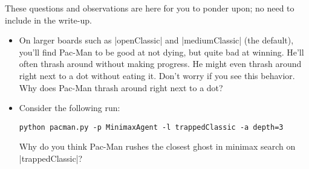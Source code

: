 These questions and observations are here for you to ponder upon; no need to
include in the write-up.

\begin{itemize}
  \item On larger boards such as |openClassic| and |mediumClassic| (the
  default), you'll find Pac-Man to be good at not dying, but quite bad at
  winning. He'll often thrash around without making progress. He might even
  thrash around right next to a dot without eating it. Don't worry if you see
  this behavior. Why does Pac-Man thrash around right next to a dot?

  \item Consider the following run:

  \begin{lstlisting}
python pacman.py -p MinimaxAgent -l trappedClassic -a depth=3
\end{lstlisting}

  Why do you think Pac-Man rushes the closest ghost in minimax search on
  |trappedClassic|?



\end{itemize}